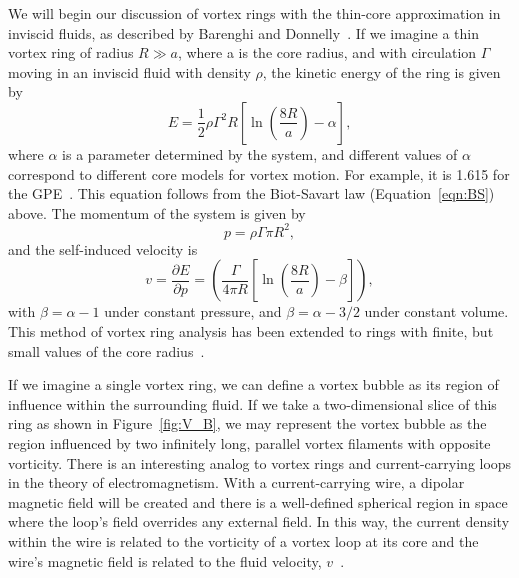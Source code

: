 We will begin our discussion of vortex rings with the thin-core approximation in inviscid fluids, as described by Barenghi and Donnelly~\cite{Barenghi2009}. 
If we imagine a thin vortex ring of radius $R\gg a$, where a is the core radius, and  with circulation $\Gamma$ moving in an inviscid fluid with density $\rho$, the kinetic energy of the ring is given by
\begin{equation}
    E = \frac 1 2 \rho \Gamma^2R\left[\ln\left(\frac{8R}{a}\right)-\alpha\right],
\end{equation}
where $\alpha$ is a parameter determined by the system, and different
values of $\alpha$ correspond to different core models for vortex motion. 
For example, it is 1.615 for the GPE~\cite{Roberts1971}.
This equation follows from the Biot-Savart law (Equation~\eqref{eqn:BS}) above. 
The momentum of the system is given by
\begin{equation}
    p = \rho \Gamma \pi R^2,
\end{equation}
and the self-induced velocity is~\cite{Roberts1970}
\begin{equation}
    v = \frac{\partial E}{\partial p} = \left(\frac{\Gamma}{4 \pi R}\left[\ln(\frac{8R}{a})-\beta\right]\right),
\end{equation}
with $\beta = \alpha - 1$ under constant pressure, and $\beta = \alpha - 3/2$ under constant volume. 
This method of vortex ring analysis has been extended to rings with finite, but small values of the core radius~\cite{Fraenkel1970, Fraenkel1972}.

If we imagine a single vortex ring, we can define a vortex bubble as its region of influence within the surrounding fluid. 
If we take a two-dimensional slice of this ring as shown in Figure~\ref{fig:V_B}, we may represent the vortex bubble as the region influenced by two infinitely long, parallel vortex filaments with opposite vorticity. 
There is an interesting analog to vortex rings and current-carrying loops in the theory of electromagnetism. 
With a current-carrying wire, a dipolar magnetic field will be created and there is a well-defined spherical region in space where the loop's field overrides any external field. 
In this way, the current density within the wire is related to the vorticity of a vortex loop at its core and the wire's magnetic field is related to the fluid velocity, $v$~\cite{Fetter1966}.

